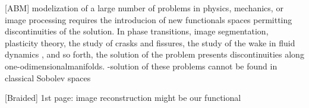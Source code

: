 [ABM] modelization of a large number of problems in physics, mechanics, or image
processing requires the introducion of new functionals spaces permitting
discontinuities of the solution. In phase transitions, image segmentation,
plasticity theory, the study of crasks and fissures, the study of the wake in
fluid dynamics , and so forth, the solution of the problem presents
discontinuities along one-odimensionalmanifolds.
-solution of these problems cannot be found in classical Sobolev spaces

[Braided] 1st page: image reconstruction might be our functional
